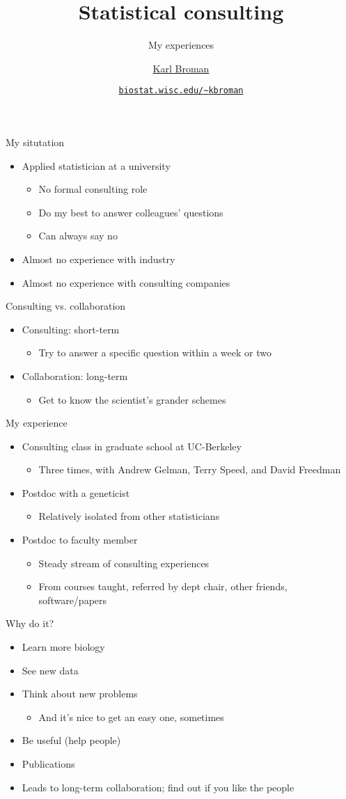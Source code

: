 \documentclass[12pt,t]{beamer}
\title{Statistical consulting}
\subtitle{My experiences}
\author{\href{http://www.biostat.wisc.edu/~kbroman}{Karl Broman}}
\institute{\href{http://www.biostat.wisc.edu}{Biostatistics \& Medical Informatics} \\[2pt] \href{http://www.wisc.edu}{University of Wisconsin{\textendash}Madison}}
\date{\href{http://www.biostat.wisc.edu/~kbroman}{\tt \scriptsize biostat.wisc.edu/{\textasciitilde}kbroman}}
\newcommand{\bbi}{\vspace{24pt} \begin{itemize} \itemsep12pt}
\newcommand{\bi}{\begin{itemize}}
\newcommand{\ei}{\end{itemize}}
\begin{document}
{
\frame{
  \titlepage
} }



\begin{frame}{My situtation}

\bbi
\item Applied statistician at a university
\bi
\item No formal consulting role
\item Do my best to answer colleagues' questions
\item Can always say no
\ei
\item Almost no experience with industry
\item Almost no experience with consulting companies
\ei

\end{frame}

\begin{frame}{Consulting vs. collaboration}

\bbi
\item {\color{hilight} Consulting}: short-term
\bi
\item Try to answer a specific question within a week or two
\ei
\item {\color{hilight} Collaboration}: long-term
\bi
\item Get to know the scientist's grander schemes
\ei

\ei

\end{frame}

\begin{frame}{My experience}

\bbi
\item Consulting class in graduate school at UC-Berkeley
\bi
\item Three times, with Andrew Gelman, Terry Speed, and David Freedman
\ei
\item Postdoc with a geneticist
\bi
\item Relatively isolated from other statisticians
\ei
\item Postdoc to faculty member
\bi
\item Steady stream of consulting experiences
\item From courses taught, referred by dept chair, other friends, software/papers
\ei
\ei

\end{frame}

\begin{frame}{Why do it?}

\bbi
\item Learn more biology
\item See new data
\item Think about new problems
\bi
\item And it's nice to get an easy one, sometimes
\ei
\item Be useful (help people)
\item Publications
\item Leads to long-term collaboration; find out if you like the
     people
\ei
\end{frame}
\end{document}

